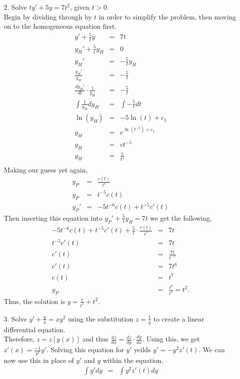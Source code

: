 \documentclass[10pt]{article}
\begin{document}
\begin{enumerate}
            \item[2.] Solve $ty'+5y=7t^2$, given $t>0$.\\
            Begin by dividing through by $t$ in order to simplify the problem, then moving on to the homogeneous equation first.
            \begin{eqnarray*}
                y'+\frac{5}{t}y&=&7t\\
                y_H'+\frac{5}{t}y_H&=&0\\
                y_H'&=&-\frac{5}{t}y_H\\
                \frac{y_H'}{y_H}&=&-\frac{5}{t}\\
                \frac{dy_H'}{dt}\cdot\frac{1}{y_H}&=&-\frac{5}{t}\\
                \int{\frac{1}{y_H}dy_H}&=&\int{-\frac{5}{t}dt}\\
                \ln(y_H)&=&-5\ln(t)+c_1\\
                y_H&=&e^{\ln(t^{-5})+c_1}\\
                y_H&=&c t^{-5}\\
                y_H&=&\frac{c}{t^5}\\
            \end{eqnarray*}
            Making our guess yet again,
            \begin{eqnarray*}
                y_P&=&\frac{c(t)}{t^5}\\
                y_P&=&t^{-5}c(t)\\
                y_P'&=&-5t^{-6}c(t)+t^{-5}c'(t)
            \end{eqnarray*}
            Then inserting this equation into $y_P'+\frac{5}{t}y_H=7t$ we get the following,
            \begin{eqnarray*}
                -5t^{-6}c(t)+t^{-5}c'(t)+\frac{5}{t}\cdot\frac{c(t)}{t^5}&=&7t\\
                t^{-5}c'(t)&=&7t\\
                c'(t)&=&\frac{7t}{t^{-5}}\\
                c'(t)&=&7t^6\\
                c(t)&=&t^7\\
                y_P&=&\frac{t^7}{t^5}=t^2.
            \end{eqnarray*}
        Thus, the solution is $y=\frac{c}{t^5}+t^2$.
        
        \item[3.] Solve $y'+\frac{y}{x}=xy^2$ using the substitution $z=\frac{1}{y}$ to create a linear differential equation.\\
        Therefore, $z=z[y(x)]$ and thus $\frac{dz}{dx}=\frac{dz}{dy}\cdot\frac{dy}{dx}$. Using this, we get $z'(x)=\frac{-1}{y^2}y'$. Solving this equation for $y'$ yeilds $y'=-y^2 z'(t)$. We can now use this in place of $y'$ and $y$ within the equation.
        \begin{eqnarray*}
            \int{y'dy}&=&\int{y^2 z'(t)dy}\\
        \end{eqnarray*}
        \end{enumerate}
        
\end{document}

